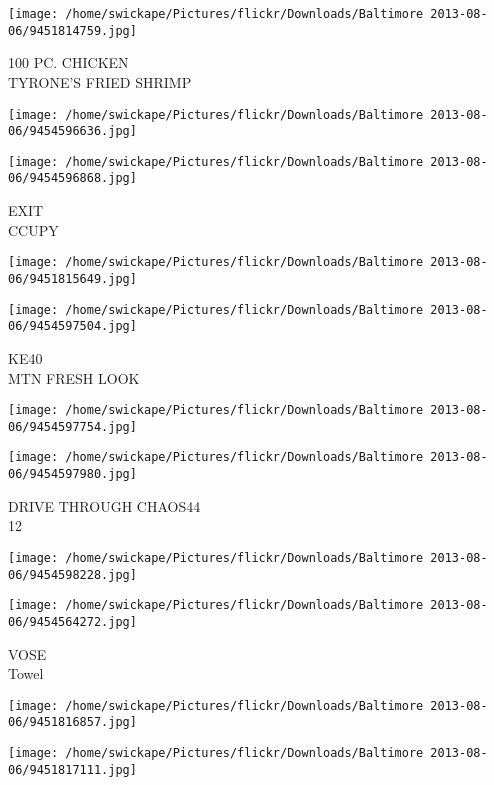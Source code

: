 \documentclass[10pt,letterpaper]{article}
\begin{document}
\vspace{0.25in}
\texttt{[image: /home/swickape/Pictures/flickr/Downloads/Baltimore 2013-08-06/9451814759.jpg]}

100 PC. CHICKEN\\
TYRONE'S FRIED SHRIMP
\pagebreak

\texttt{[image: /home/swickape/Pictures/flickr/Downloads/Baltimore 2013-08-06/9454596636.jpg]}

\vspace{0.25in}
\texttt{[image: /home/swickape/Pictures/flickr/Downloads/Baltimore 2013-08-06/9454596868.jpg]}

EXIT\\
CCUPY
\pagebreak

\texttt{[image: /home/swickape/Pictures/flickr/Downloads/Baltimore 2013-08-06/9451815649.jpg]}

\vspace{0.25in}
\texttt{[image: /home/swickape/Pictures/flickr/Downloads/Baltimore 2013-08-06/9454597504.jpg]}

KE40\\
MTN FRESH LOOK
\pagebreak

\texttt{[image: /home/swickape/Pictures/flickr/Downloads/Baltimore 2013-08-06/9454597754.jpg]}

\vspace{0.25in}
\texttt{[image: /home/swickape/Pictures/flickr/Downloads/Baltimore 2013-08-06/9454597980.jpg]}

DRIVE THROUGH CHAOS44\\
12
\pagebreak

\texttt{[image: /home/swickape/Pictures/flickr/Downloads/Baltimore 2013-08-06/9454598228.jpg]}

\vspace{0.25in}
\texttt{[image: /home/swickape/Pictures/flickr/Downloads/Baltimore 2013-08-06/9454564272.jpg]}

VOSE\\
Towel
\pagebreak

\texttt{[image: /home/swickape/Pictures/flickr/Downloads/Baltimore 2013-08-06/9451816857.jpg]}

\vspace{0.25in}
\texttt{[image: /home/swickape/Pictures/flickr/Downloads/Baltimore 2013-08-06/9451817111.jpg]}
\end{document}
